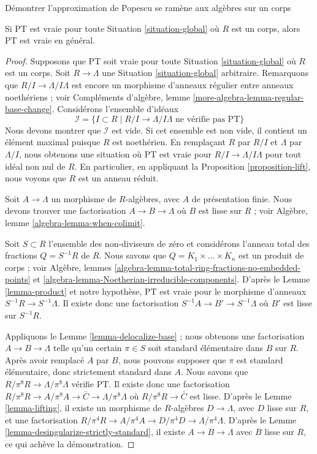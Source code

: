\begin{lemma}
\label{lemma-reduce-to-field}
\begin{slogan}
Démontrer l'approximation de Popescu se ramène aux algèbres sur un corps
\end{slogan}
Si PT est vraie pour toute Situation \ref{situation-global} où $R$
est un corps, alors PT est vraie en général.
\end{lemma}

\begin{proof}
Supposons que PT soit vraie pour toute Situation \ref{situation-global} où $R$ est un corps.
Soit $R \to \Lambda$ une Situation \ref{situation-global} arbitraire.
Remarquons que $R/I \to \Lambda/I\Lambda$ est encore un morphisme d'anneaux régulier
entre anneaux noethériens ; voir
Compléments d'algèbre, lemme \ref{more-algebra-lemma-regular-base-change}.
Considérons l'ensemble d'idéaux
$$
\mathcal{I} = \{I \subset R \mid R/I \to \Lambda/I\Lambda
\text{ ne vérifie pas PT}\}
$$
Nous devons montrer que $\mathcal{I}$ est vide. Si cet ensemble est non vide,
il contient un élément maximal puisque $R$ est noethérien.
En remplaçant $R$ par $R/I$ et $\Lambda$ par $\Lambda/I$, nous obtenons une
situation où PT est vraie pour $R/I \to \Lambda/I\Lambda$ pour tout
idéal non nul de $R$. En particulier, en appliquant la
Proposition \ref{proposition-lift},
nous voyons que $R$ est un anneau réduit.

\medskip\noindent
Soit $A \to \Lambda$ un morphisme de $R$-algèbres, avec $A$ de
présentation finie. Nous devons trouver une factorisation $A \to B \to \Lambda$
où $B$ est lisse sur $R$ ; voir Algèbre, lemme \ref{algebra-lemma-when-colimit}.

\medskip\noindent
Soit $S \subset R$ l'ensemble des non-diviseurs de zéro et
considérons l'anneau total des fractions $Q = S^{-1}R$ de $R$. Nous savons que
$Q = K_1 \times \ldots \times K_n$ est un produit de corps ; voir
Algèbre, lemmes \ref{algebra-lemma-total-ring-fractions-no-embedded-points} et
\ref{algebra-lemma-Noetherian-irreducible-components}.
D'après le Lemme \ref{lemma-product} et notre hypothèse,
PT est vraie pour le morphisme d'anneaux $S^{-1}R \to S^{-1}\Lambda$.
Il existe donc une factorisation $S^{-1}A \to B' \to S^{-1}\Lambda$
où $B'$ est lisse sur $S^{-1}R$.

\medskip\noindent
Appliquons le Lemme \ref{lemma-delocalize-base} ;
nous obtenons une factorisation $A \to B \to \Lambda$ telle qu'un
certain $\pi \in S$ soit standard élémentaire dans $B$ sur $R$.
Après avoir remplacé $A$ par $B$, nous pouvons supposer que $\pi$ est
standard élémentaire, donc strictement standard dans $A$. Nous savons que
$R/\pi^8R \to \Lambda/\pi^8\Lambda$ vérifie PT.
Il existe donc une factorisation
$R/\pi^8 R \to A/\pi^8A \to \bar C \to \Lambda/\pi^8\Lambda$
où $R/\pi^8 R \to \bar C$ est lisse. D'après le
Lemme \ref{lemma-lifting},
il existe un morphisme de $R$-algèbres $D \to \Lambda$, avec $D$ lisse sur $R$,
et une factorisation
$R/\pi^4 R \to A/\pi^4A \to D/\pi^4D \to \Lambda/\pi^4\Lambda$.
D'après le Lemme \ref{lemma-desingularize-strictly-standard},
il existe $A \to B \to \Lambda$ avec $B$ lisse sur $R$,
ce qui achève la démonstration.
\end{proof}

